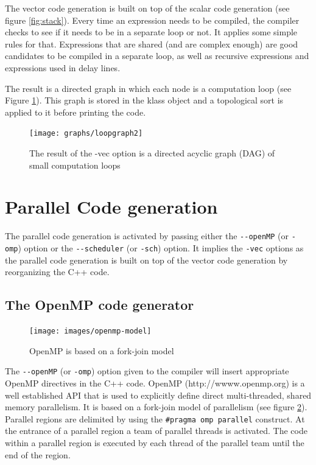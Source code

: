 \documentclass[a4paper,10pt]{book}
\begin{document}
The vector code generation is built on top of the scalar code generation (see figure \ref{fig:stack}). Every time an expression needs to be compiled, the compiler checks to see if it needs to be in a separate loop or not. It applies some simple rules for that. Expressions that are shared (and are complex enough) are good candidates to be compiled in a separate loop, as well as recursive expressions and expressions used in delay lines. 

The result is a directed graph in which each node is a computation loop (see Figure \ref{fig:loopgraph}). This graph is stored in the klass object and a topological sort is applied to it before printing the code. 

\begin{figure}[htb]
  \centering
  \texttt{[image: graphs/loopgraph2]}
  \caption{The result of the -vec option is a directed acyclic graph (DAG) of small computation loops}   
  \label{fig:loopgraph}
\end{figure}


\section{Parallel Code generation}

The parallel code generation is activated by passing either the \lstinline!--openMP! (or \lstinline!-omp!) option or the \lstinline!--scheduler! (or \lstinline!-sch!) option. It implies the \lstinline!-vec! options as the parallel code generation is built on top of the vector code generation by reorganizing the C++ code.  


\subsection{The OpenMP code generator}

\begin{figure}[htb]
  \centering
  \texttt{[image: images/openmp-model]}
  \caption{OpenMP is based on a fork-join model}   
  \label{fig:openmp}
\end{figure}

The \lstinline!--openMP! (or \lstinline!-omp!) option given to the \faust compiler will insert appropriate OpenMP directives in the C++ code. OpenMP (http://wwww.openmp.org) is a well established API that is used to explicitly define direct multi-threaded, shared memory parallelism. It is based on a fork-join model of parallelism (see figure \ref{fig:openmp}). 
Parallel regions are delimited by using the \lstinline!#pragma omp parallel! construct. At the entrance of a parallel region a team of parallel threads is activated. The code within a parallel region is executed by each thread of the parallel team until the end of the region. 
\end{document}
